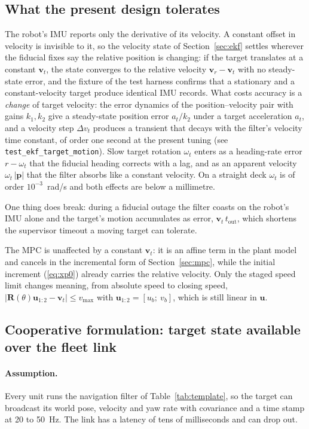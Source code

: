 \documentclass[11pt,a4paper]{article}
\newcommand{\vect}[1]{\bm{#1}}
\newcommand{\mat}[1]{\bm{#1}}
\newcommand{\Rot}{\mat{R}}
\begin{document}
\subsection{What the present design tolerates}
\label{sec:tolerates}
The robot's IMU reports only the derivative of its velocity. A constant offset in velocity is invisible to it, so the velocity state of Section~\ref{sec:ekf} settles wherever the fiducial fixes say the relative position is changing: if the target translates at a constant $\vect v_t$, the state converges to the relative velocity $\vect v_r-\vect v_t$ with no steady-state error, and the fixture of the test harness confirms that a stationary and a constant-velocity target produce identical IMU records. What costs accuracy is a \emph{change} of target velocity: the error dynamics of the position--velocity pair with gains $k_1,k_2$ give a steady-state position error $a_t/k_2$ under a target acceleration $a_t$, and a velocity step $\Delta v_t$ produces a transient that decays with the filter's velocity time constant, of order one second at the present tuning (see \texttt{test\_ekf\_target\_motion}). Slow target rotation $\omega_t$ enters as a heading-rate error $r-\omega_t$ that the fiducial heading corrects with a lag, and as an apparent velocity $\omega_t\,|\vect p|$ that the filter absorbs like a constant velocity. On a straight deck $\omega_t$ is of order $10^{-3}$~rad/s and both effects are below a millimetre.

One thing does break: during a fiducial outage the filter coasts on the robot's IMU alone and the target's motion accumulates as error, $\vect v_t\,t_{\mathrm{out}}$, which shortens the supervisor timeout a moving target can tolerate.

The MPC is unaffected by a constant $\vect v_t$: it is an affine term in the plant model and cancels in the incremental form of Section~\ref{sec:mpc}, while the initial increment (\ref{eq:xp0}) already carries the relative velocity. Only the staged speed limit changes meaning, from absolute speed to closing speed, $|\Rot(\theta)\vect u_{1:2}-\vect v_t|\le v_{\max}$ with $\vect u_{1:2}=[u_b;\ v_b]$, which is still linear in $\vect u$.

\subsection{Cooperative formulation: target state available over the fleet link}
\label{sec:coop}

\paragraph{Assumption.} Every unit runs the navigation filter of Table~\ref{tab:template}, so the target can broadcast its world pose, velocity and yaw rate with covariance and a time stamp at 20 to 50~Hz. The link has a latency of tens of milliseconds and can drop out.
\end{document}
